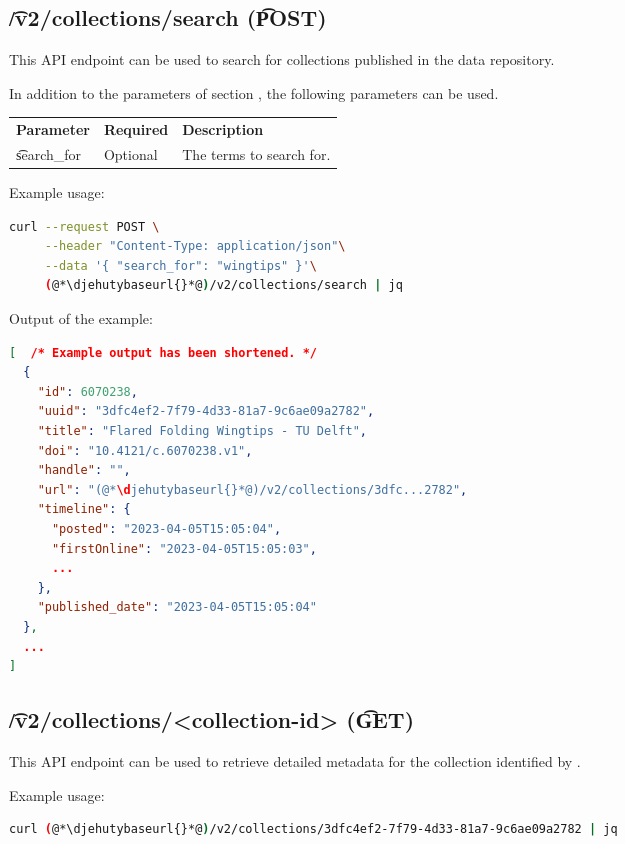 \subsection{\t{/v2/collections/search} (\t{POST})}

  This API endpoint can be used to search for collections published in
  the data repository.

  In addition to the parameters of section , the
  following parameters can be used.

\begin{tabularx}{\textwidth}{*{2}{!{\VRule[-1pt]}l}!{\VRule[-1pt]}X}
  \headrow
  \textbf{Parameter}   & \textbf{Required} & \textbf{Description}\\
  \t{search\_for}      & Optional          & The terms to search for.
\end{tabularx}

  Example usage:
\begin{lstlisting}[language=bash]
curl --request POST \
     --header "Content-Type: application/json"\
     --data '{ "search_for": "wingtips" }'\
     (@*\djehutybaseurl{}*@)/v2/collections/search | jq
\end{lstlisting}

  Output of the example:
\begin{lstlisting}[language=JSON]
[  /* Example output has been shortened. */
  {
    "id": 6070238,
    "uuid": "3dfc4ef2-7f79-4d33-81a7-9c6ae09a2782",
    "title": "Flared Folding Wingtips - TU Delft",
    "doi": "10.4121/c.6070238.v1",
    "handle": "",
    "url": "(@*\djehutybaseurl{}*@)/v2/collections/3dfc...2782",
    "timeline": {
      "posted": "2023-04-05T15:05:04",
      "firstOnline": "2023-04-05T15:05:03",
      ...
    },
    "published_date": "2023-04-05T15:05:04"
  },
  ...
]
\end{lstlisting}

\subsection{\t{/v2/collections/<collection-id>} (\t{GET})}

  This API endpoint can be used to retrieve detailed metadata for the collection
  identified by \code{collection-id}.

  Example usage:
\begin{lstlisting}[language=bash]
curl (@*\djehutybaseurl{}*@)/v2/collections/3dfc4ef2-7f79-4d33-81a7-9c6ae09a2782 | jq
\end{lstlisting}

